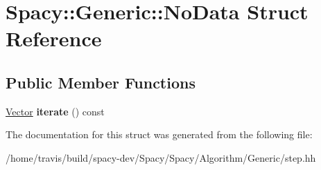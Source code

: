 \hypertarget{structSpacy_1_1Generic_1_1NoData}{\section{Spacy\-:\-:Generic\-:\-:No\-Data Struct Reference}
\label{structSpacy_1_1Generic_1_1NoData}
}
\subsection*{Public Member Functions}
\begin{DoxyCompactItemize}
\item 
\hypertarget{structSpacy_1_1Generic_1_1NoData_a2f6f7b1b8fba2eabe7dc36dca817b4a3}{\hyperlink{classSpacy_1_1Generic_1_1Vector}{Vector} {\bfseries iterate} () const }\label{structSpacy_1_1Generic_1_1NoData_a2f6f7b1b8fba2eabe7dc36dca817b4a3}

\end{DoxyCompactItemize}


The documentation for this struct was generated from the following file\-:\begin{DoxyCompactItemize}
\item 
/home/travis/build/spacy-\/dev/\-Spacy/\-Spacy/\-Algorithm/\-Generic/step.\-hh\end{DoxyCompactItemize}
